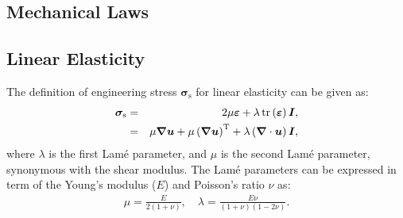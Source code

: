 \documentclass[sn-mathphys,Numbered]{sn-jnl}%
\newcommand{\bb}{\boldsymbol}
\begin{document}
%
\newpage
%
\setcounter{figure}{0}
\begin{appendices}
%
%
\section{Mechanical Laws}
\label{app:mechLaws}
%
%
\subsection{Linear Elasticity}
The definition of engineering stress $\bb{\sigma}_\text{s}$ for linear elasticity can be given as:
%
\begin{eqnarray}  \label{eq:linearElastic}
	\bb{\sigma}_\text{s}
	&=& 2 \mu \bb{\varepsilon} + \lambda \, \text{tr} \left( \bb{\varepsilon} \right) \bb{I} \notag, \\
	&=& \mu \bb{\nabla} \bb{u} + \mu \left( \bb{\nabla} \bb{u}\right)^{\text{T}} + \lambda \left(\bb{\nabla} \cdot \bb{u} \right) \bb{I},
\end{eqnarray}
%
where $\lambda$ is the first Lam\'{e} parameter, and $\mu$ is the second Lam\'{e} parameter, synonymous with the shear modulus.
The Lam\'{e} parameters can be expressed in term of the Young's modulus ($E$) and Poisson's ratio $\nu$ as:
%
\begin{eqnarray}
	\mu = \frac{E}{2(1 + \nu)}, \quad \lambda = \frac{E \nu}{(1+\nu)(1 - 2\nu)}.
\end{eqnarray}
%
%
%

\end{appendices}
\end{document}
